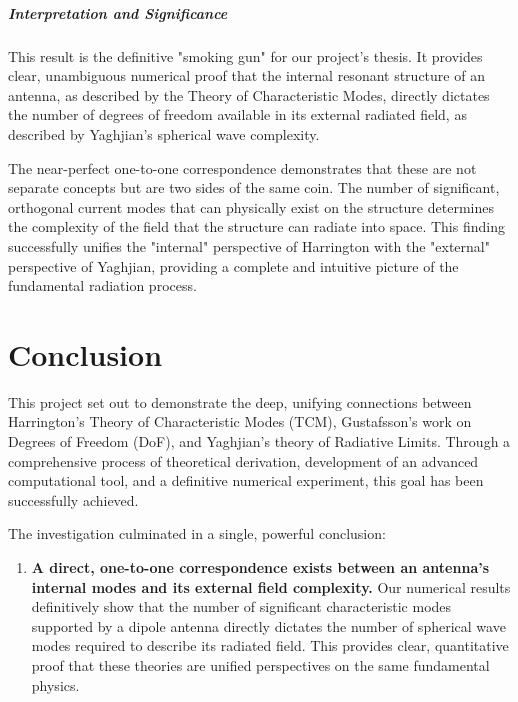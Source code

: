 \documentclass[11pt, a4paper]{report}
\begin{document}
\paragraph{Interpretation and Significance}
This result is the definitive "smoking gun" for our project's thesis. It provides clear, unambiguous numerical proof that the internal resonant structure of an antenna, as described by the Theory of Characteristic Modes, directly dictates the number of degrees of freedom available in its external radiated field, as described by Yaghjian's spherical wave complexity.

The near-perfect one-to-one correspondence demonstrates that these are not separate concepts but are two sides of the same coin. The number of significant, orthogonal current modes that can physically exist on the structure determines the complexity of the field that the structure can radiate into space. This finding successfully unifies the "internal" perspective of Harrington with the "external" perspective of Yaghjian, providing a complete and intuitive picture of the fundamental radiation process.

\newpage

\chapter{Conclusion}

This project set out to demonstrate the deep, unifying connections between Harrington's Theory of Characteristic Modes (TCM), Gustafsson's work on Degrees of Freedom (DoF), and Yaghjian's theory of Radiative Limits. Through a comprehensive process of theoretical derivation, development of an advanced computational tool, and a definitive numerical experiment, this goal has been successfully achieved.

The investigation culminated in a single, powerful conclusion:
\begin{enumerate}
    \item \textbf{A direct, one-to-one correspondence exists between an antenna's internal modes and its external field complexity.} Our numerical results definitively show that the number of significant characteristic modes supported by a dipole antenna directly dictates the number of spherical wave modes required to describe its radiated field. This provides clear, quantitative proof that these theories are unified perspectives on the same fundamental physics.
\end{enumerate}
\end{document}
